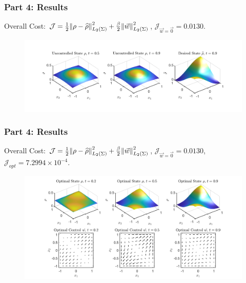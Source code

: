 \documentclass[aspectratio=169,xcolor=dvipsnames]{beamer}
\begin{document}
\begin{frame}
	\frametitle{Part 4: Results}
	Overall Cost: $\mathcal J = \frac{1}{2}\norm{\rho- \widehat{\rho}}_{L_2(\Sigma)}^2 + \frac{\beta}{2} \norm{\vec{w}}_{L_2(\Sigma)}^2$, $\mathcal J_{\vec{w}= \vec 0} = 0.0130$.

	\begin{figure}
		\includegraphics[width=15cm]{Res1Ex2.png}
	\end{figure}
	
\end{frame}

\begin{frame}
	\frametitle{Part 4: Results}
	\vspace{0.3cm}
	Overall Cost: $\mathcal J = \frac{1}{2}\norm{\rho- \widehat{\rho}}_{L_2(\Sigma)}^2 + \frac{\beta}{2} \norm{\vec{w}}_{L_2(\Sigma)}^2$, $\mathcal J_{\vec{w} = \vec 0} = 0.0130$, $\mathcal J_{opt} = 7.2994 \times 10^{-4}$.
	\begin{figure}
		\includegraphics[width=14cm]{Res2Ex2.png}
	\end{figure}
\end{frame}
\end{document}
